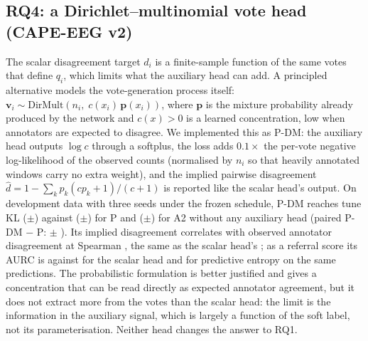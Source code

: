 \documentclass[sigconf,anonymous]{acmart}
\begin{document}
\subsection{RQ4: a Dirichlet--multinomial vote head (CAPE-EEG v2)}
\label{sec:dm}
The scalar disagreement target $d_i$ is a finite-sample function of the same votes that define $q_i$, which limits what the auxiliary head can add. A principled alternative models the vote-generation process itself: $\mathbf v_i\sim\mathrm{DirMult}(n_i,\;c(x_i)\,\mathbf p(x_i))$, where $\mathbf p$ is the mixture probability already produced by the network and $c(x)>0$ is a learned concentration, low when annotators are expected to disagree. We implemented this as P-DM: the auxiliary head outputs $\log c$ through a softplus, the loss adds $0.1\times$ the per-vote negative log-likelihood of the observed counts (normalised by $n_i$ so that heavily annotated windows carry no extra weight), and the implied pairwise disagreement $\hat d=1-\sum_k p_k(c p_k+1)/(c+1)$ is reported like the scalar head's output. On development data with three seeds under the frozen schedule, P-DM reaches tune KL \dmklPDM{} ($\pm$\dmklsdPDM) against \dmklP{} ($\pm$\dmklsdP) for P and \dmklAtwo{} ($\pm$\dmklsdAtwo) for A2 without any auxiliary head (paired P-DM $-$ P: \ddmvsp{} $\pm$ \dsddmvsp). Its implied disagreement correlates with observed annotator disagreement at Spearman \dmrhoPDM{}, the same as the scalar head's \dmrhoP{}; as a referral score its AURC is \dmaurcDPDM{} against \dmaurcDP{} for the scalar head and \dmaurcEPDM{} for predictive entropy on the same predictions. The probabilistic formulation is better justified and gives a concentration that can be read directly as expected annotator agreement, but it does not extract more from the votes than the scalar head: the limit is the information in the auxiliary signal, which is largely a function of the soft label, not its parameterisation. Neither head changes the answer to RQ1.
\end{document}
